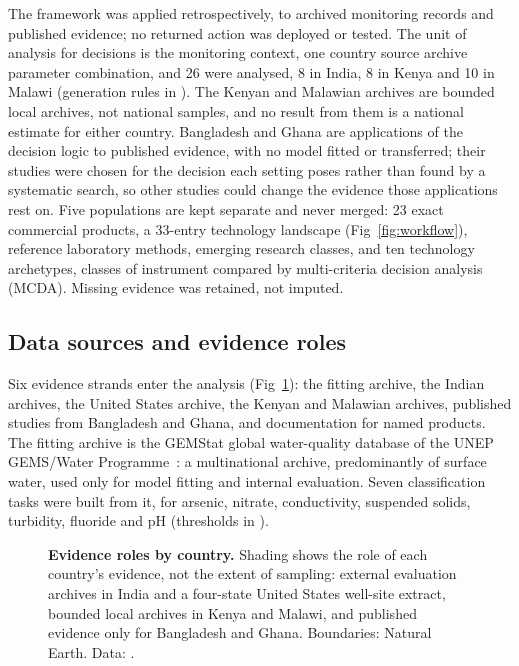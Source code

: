 \documentclass[10pt,letterpaper]{article}
\begin{document}
The framework was applied retrospectively, to archived monitoring records and published evidence; no returned action was deployed or tested. The unit of analysis for decisions is the monitoring context, one country \texttimes{} source archive \texttimes{} parameter combination, and 26 were analysed, 8 in India, 8 in Kenya and 10 in Malawi (generation rules in ). The Kenyan and Malawian archives are bounded local archives, not national samples, and no result from them is a national estimate for either country. Bangladesh and Ghana are applications of the decision logic to published evidence, with no model fitted or transferred; their studies were chosen for the decision each setting poses rather than found by a systematic search, so other studies could change the evidence those applications rest on. Five populations are kept separate and never merged: 23 exact commercial products, a 33-entry technology landscape (Fig~\ref{fig:workflow}), reference laboratory methods, emerging research classes, and ten technology archetypes, classes of instrument compared by multi-criteria decision analysis (MCDA). Missing evidence was retained, not imputed.

\subsection*{Data sources and evidence roles}

Six evidence strands enter the analysis (Fig~\ref{fig:evidence-map}): the fitting archive, the Indian archives, the United States archive, the Kenyan and Malawian archives, published studies from Bangladesh and Ghana, and documentation for named products. The fitting archive is the GEMStat global water-quality database of the UNEP GEMS/Water Programme~\cite{GEMStat}: a multinational archive, predominantly of surface water, used only for model fitting and internal evaluation. Seven classification tasks were built from it, for arsenic, nitrate, conductivity, suspended solids, turbidity, fluoride and pH (thresholds in ).\label{callout:fig:evidence-map}

\begin{figure}[!ht]
\caption{\textbf{Evidence roles by country.} Shading shows the role of each country's evidence, not the extent of sampling: external evaluation archives in India and a four-state United States well-site extract, bounded local archives in Kenya and Malawi, and published evidence only for Bangladesh and Ghana. Boundaries: Natural Earth. Data: .}
\label{fig:evidence-map}
\end{figure}
\end{document}
